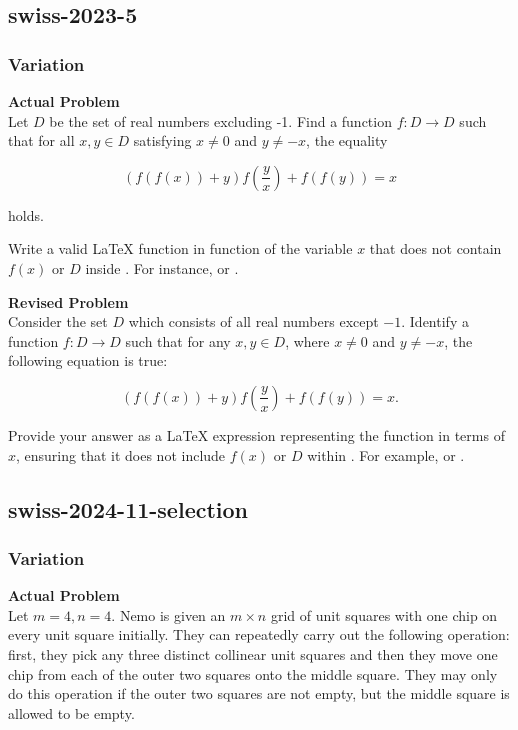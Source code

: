 \subsection{swiss-2023-5}
\subsubsection{Variation}
\textbf{Actual Problem}\\
Let $D$ be the set of real numbers excluding -1. Find a function $f: D \rightarrow D$ such that for all $x, y \in D$ satisfying $x \neq 0$ and $y \neq -x$, the equality

$$\left(f(f(x)) + y\right) f(\frac{y}{x}) + f(f(y)) = x$$

holds.

Write a valid LaTeX function in function of the variable $x$ that does not contain $f(x)$ or $D$ inside \boxed. For instance,  or .

\textbf{Revised Problem}\\
Consider the set \( D \) which consists of all real numbers except \(-1\). Identify a function \( f: D \rightarrow D \) such that for any \( x, y \in D \), where \( x \neq 0 \) and \( y \neq -x \), the following equation is true:

$$\left(f(f(x)) + y\right) f\left(\frac{y}{x}\right) + f(f(y)) = x.$$

Provide your answer as a LaTeX expression representing the function in terms of \( x \), ensuring that it does not include \( f(x) \) or \( D \) within \boxed. For example,  or .

\subsection{swiss-2024-11-selection}
\subsubsection{Variation}
\textbf{Actual Problem}\\
Let $m = 4, n = 4$. Nemo is given an $m \times n$ grid of unit squares with one chip on every unit square initially. They can repeatedly carry out the following operation: first, they pick any three distinct collinear unit squares and then they move one chip from each of the outer two squares onto the middle square. They may only do this operation if the outer two squares are not empty, but the middle square is allowed to be empty. 

